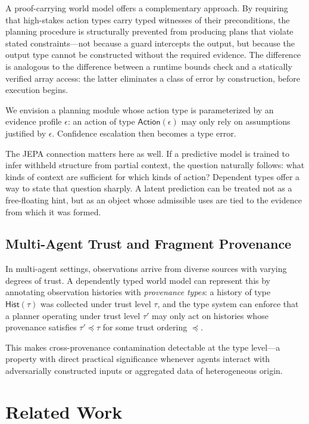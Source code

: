 \documentclass[12pt, a4paper]{article}
\begin{document}
A proof-carrying world model offers a complementary approach. By requiring that
high-stakes action types carry typed witnesses of their preconditions, the
planning procedure is structurally prevented from producing plans that violate
stated constraints---not because a guard intercepts the output, but because the
output type cannot be constructed without the required evidence. The difference
is analogous to the difference between a runtime bounds check and a statically
verified array access: the latter eliminates a class of error by construction,
before execution begins.

We envision a planning module whose action type is parameterized by an evidence
profile $\epsilon$: an action of type $\mathsf{Action}(\epsilon)$ may only rely
on assumptions justified by $\epsilon$. Confidence escalation then becomes a
type error.

The JEPA connection matters here as well. If a predictive model is trained to
infer withheld structure from partial context, the question naturally follows:
what kinds of context are sufficient for which kinds of action? Dependent types
offer a way to state that question sharply. A latent prediction can be treated
not as a free-floating hint, but as an object whose admissible uses are tied to
the evidence from which it was formed.

\subsection{Multi-Agent Trust and Fragment Provenance}

In multi-agent settings, observations arrive from diverse sources with varying
degrees of trust. A dependently typed world model can represent this by
annotating observation histories with \emph{provenance types}: a history of
type $\mathsf{Hist}(\tau)$ was collected under trust level $\tau$, and the type
system can enforce that a planner operating under trust level $\tau'$ may only
act on histories whose provenance satisfies $\tau' \preceq \tau$ for some trust
ordering $\preceq$.

This makes cross-provenance contamination detectable at the type level---a
property with direct practical significance whenever agents interact with
adversarially constructed inputs or aggregated data of heterogeneous origin.

\section{Related Work}
\label{sec:related}
\end{document}
